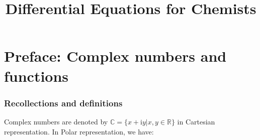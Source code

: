 \documentclass{article}
\newcommand{\mathi}{\mathrm{i}}
\begin{document}
\title{Differential Equations for Chemists}

\maketitle

{\tableofcontents}

\part*{Preface: Complex numbers and functions}

\section*{Recollections and definitions}

Complex numbers are denoted by $\mathbb{C}= \{ x + \mathi y|x, y \in
\mathbb{R} \}$ in Cartesian representation. In Polar representation, we have:

\begin{center}
\end{center}
\end{document}
